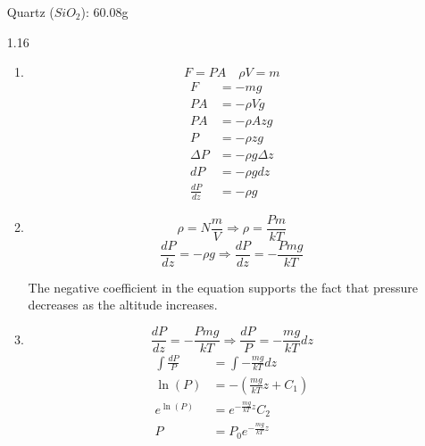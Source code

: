 \documentclass{article}
\begin{document}
\begin{enumerate}
    Quartz (\(SiO_2\)): 60.08g
    \vspace{0.1in}
    \item [1.16]
    \begin{enumerate}
        \item
            \begin{equation*}
                F = PA \quad \rho V = m    
            \end{equation*}
            \begin{align*}
                F &= -mg \\
                PA &= - \rho Vg \\
                PA &= - \rho Azg \\
                P &= - \rho zg \\
                \Delta P &= - \rho g \Delta z \\
                dP &= - \rho g dz \\
                \frac{dP}{dz} &= - \rho g
            \end{align*}
        \vspace{0.05in}
        \item
            \begin{equation*}
                \rho = N \frac{m}{V} \Rightarrow \rho = \frac{Pm}{kT}
            \end{equation*}
            \begin{equation*}
                \frac{dP}{dz} = - \rho g \Rightarrow \frac{dP}{dz} = - \frac{Pmg}{kT}
            \end{equation*}
                        
            The negative coefficient in the equation supports the fact that pressure decreases as the altitude increases.
        \vspace{0.05in}
        \item
            \begin{equation*}
                \frac{dP}{dz} = - \frac{Pmg}{kT} \Rightarrow \frac{dP}{P} = - \frac{mg}{kT} dz
            \end{equation*}
            \begin{align*}
                \int \frac{dP}{P} &= \int - \frac{mg}{kT} dz \\
                \ln (P) &= - \left(\frac{mg}{kT} z + C_1 \right) \\
                e^{\ln (P)} &= e^{- \frac{mg}{kT}z} C_2 \\
                P &= P_0 e^{- \frac{mg}{kT}z}
            \end{align*}


\end{enumerate}
\end{enumerate}
\end{document}

